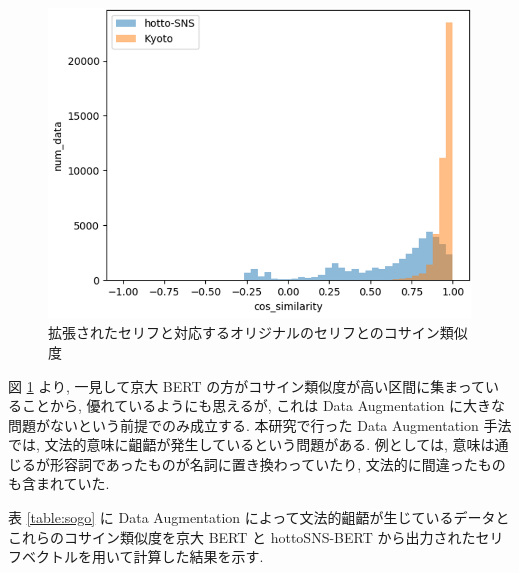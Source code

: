 \begin{figure}[!h]
  \centering
  \includegraphics[width=0.8\hsize]{doc/figures/cos_bert.png}
  \caption{拡張されたセリフと対応するオリジナルのセリフとのコサイン類似度}
  \label{fig:cos_bert}
\end{figure}

\newpage
図 \ref{fig:cos_bert} より, 一見して京大 BERT の方がコサイン類似度が高い区間に集まっていることから, 優れているようにも思えるが, これは Data Augmentation に大きな問題がないという前提でのみ成立する. 本研究で行った Data Augmentation 手法では, 文法的意味に齟齬が発生しているという問題がある. 例としては, 意味は通じるが形容詞であったものが名詞に置き換わっていたり, 文法的に間違ったものも含まれていた.

表 \ref{table:sogo} に Data Augmentation によって文法的齟齬が生じているデータとこれらのコサイン類似度を京大 BERT と hottoSNS-BERT から出力されたセリフベクトルを用いて計算した結果を示す.

\begin{table}[!h]
\vspace{10mm}
\caption{Data Augmentation による文法的齟齬}
\label{table:sogo}
\centering
{}
\vspace{10mm}
\end{table}

